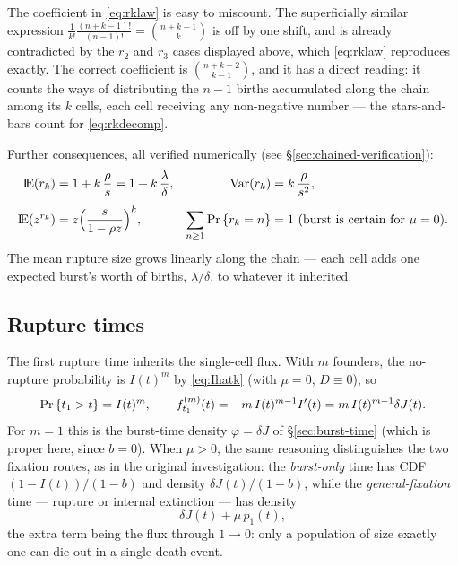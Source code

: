 \begin{remark}
The coefficient in \eqref{eq:rklaw} is easy to miscount. The superficially
similar expression $\frac{1}{k!}\frac{(n+k-1)!}{(n-1)!}
=\binom{n+k-1}{k}$ is off by one shift, and is already contradicted by the
$r_2$ and $r_3$ cases displayed above, which \eqref{eq:rklaw} reproduces
exactly. The correct coefficient is $\binom{n+k-2}{k-1}$, and it has a
direct reading: it counts the ways of distributing the $n-1$ births
accumulated along the chain among its $k$ cells, each cell receiving any
non-negative number --- the stars-and-bars count for \eqref{eq:rkdecomp}.
\end{remark}

Further consequences, all verified numerically (see
\S\ref{sec:chained-verification}):
\begin{align}
{\rm I}\!{\rm E}(r_k)&=1+k\,\frac{\rho}{s}=1+k\,\frac{\lambda}{\delta},
&
\mathrm{Var}(r_k)&=k\,\frac{\rho}{s^2},
\label{eq:rkmoments}\\[0.4em]
{\rm I}\!{\rm E}(z^{r_k})&=z\Bigl(\frac{s}{1-\rho z}\Bigr)^k,
&
\sum_{n\ge1}{\text{Pr}\left\{r_k=n\right\}}&=1\ \text{(burst is certain for $\mu=0$)}.
\label{eq:rkgf}
\end{align}
The mean rupture size grows linearly along the chain --- each cell adds one
expected burst's worth of births, $\lambda/\delta$, to whatever it inherited.

\subsection{Rupture times}
\label{sec:rupture-times}

The first rupture time inherits the single-cell flux. With $m$ founders, the
no-rupture probability is $I(t)^m$ by \eqref{eq:Ihatk} (with $\mu=0$,
$D\equiv0$), so
\begin{equation}
{\text{Pr}\left\{t_1>t\right\}}=I(t)^m,
\qquad
f_{t_1}^{(m)}(t)=-m\,I(t)^{m-1}I'(t)=m\,I(t)^{m-1}\delta J(t).
\label{eq:t1m}
\end{equation}
For $m=1$ this is the burst-time density $\varphi=\delta J$ of
\S\ref{sec:burst-time} (which is proper here, since $b=0$). When $\mu>0$,
the same reasoning distinguishes the two fixation routes, as in the
original investigation: the \emph{burst-only} time has CDF
$(1-I(t))/(1-b)$ and density $\delta J(t)/(1-b)$, while the
\emph{general-fixation} time --- rupture or internal extinction --- has
density
\begin{equation}
\delta J(t)+\mu\,p_1(t),
\end{equation}
the extra term being the flux through $1\to0$: only a population of size
exactly one can die out in a single death event.

